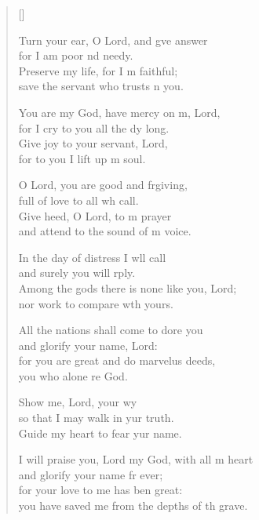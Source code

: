 \settowidth{\versewidth}{I will praise you, Lord my God, with all my heart}
\begin{verse}[\versewidth]
  \begin{patverse}
Turn your ear, O Lord, and g\pointup{\i}ve answer\Med\\
for I am poor nd needy.\\
Preserve my life, for I m faithful;\Med\\
save the servant who trusts \pointup{\i}n you.

You are my God, have mercy on m, Lord,\Med\\
for I cry to you all the dy long.\\
Give joy to your servant,  Lord,\Med\\
for to you I lift up m soul.

O Lord, you are good and frgiving,\Med\\
full of love to all wh call.\\
Give heed, O Lord, to m prayer\Med\\
and attend to the sound of m voice.

In the day of distress I w\pointup{\i}ll call\Med\\
and surely you will rply.\\
Among the gods there is none like you,  Lord;\Med\\
nor work to compare w\pointup{\i}th yours.

All the nations shall come to dore you\Med\\
and glorify your name,  Lord:\\
for you are great and do marvelus deeds,\Med\\
you who alone re God.

Show me, Lord, your wy\Flex\\
so that I may walk in yur truth.\Med\\
Guide my heart to fear yur name.

I will praise you, Lord my God, with all m heart\Med\\
and glorify your name fr ever;\\
for your love to me has ben great:\Med\\
you have saved me from the depths of th grave.


\end{patverse}
\end{verse}
